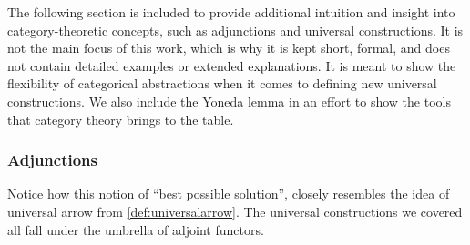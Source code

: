 \begin{remark}
  The following section is included to provide additional intuition and insight into category-theoretic concepts, such as adjunctions and universal constructions. It is not the main focus of this work, which is why it is kept short, formal, and does not contain detailed examples or extended explanations. It is meant to show the flexibility of categorical abstractions when it comes to defining new universal constructions. We also include the Yoneda lemma in an effort to show the tools that category theory brings to the table.
\end{remark}

\subsubsection{\centering Adjunctions}

Notice how this notion of ``best possible solution'', closely resembles the idea of universal arrow from \ref{def:universalarrow}. The universal constructions we covered all fall under the umbrella of adjoint functors.

